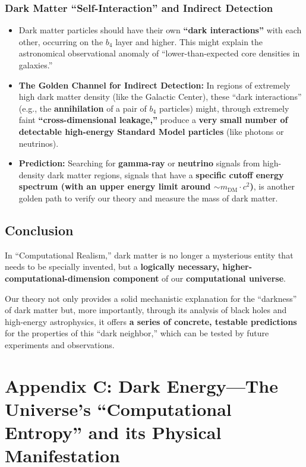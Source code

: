 \documentclass[11pt, a4paper]{article}
\begin{document}
\subsubsection{Dark Matter ``Self-Interaction'' and Indirect Detection}
\begin{itemize}
    \item Dark matter particles should have their own \textbf{``dark interactions''} with each other, occurring on the $b_4$ layer and higher. This might explain the astronomical observational anomaly of ``lower-than-expected core densities in galaxies.''
    \item \textbf{The Golden Channel for Indirect Detection:} In regions of extremely high dark matter density (like the Galactic Center), these ``dark interactions'' (e.g., the \textbf{annihilation} of a pair of $b_4$ particles) might, through extremely faint \textbf{``cross-dimensional leakage,''} produce a \textbf{very small number of detectable high-energy Standard Model particles} (like photons or neutrinos).
    \item \textbf{Prediction:} Searching for \textbf{gamma-ray} or \textbf{neutrino} signals from high-density dark matter regions, signals that have a \textbf{specific cutoff energy spectrum (with an upper energy limit around $\sim m_{\text{DM}} \cdot c^2$)}, is another golden path to verify our theory and measure the mass of dark matter.
\end{itemize}

\subsection*{Conclusion}
In ``Computational Realism,'' dark matter is no longer a mysterious entity that needs to be specially invented, but a \textbf{logically necessary, higher-computational-dimension component} of our \textbf{computational universe}.

Our theory not only provides a solid mechanistic explanation for the ``darkness'' of dark matter but, more importantly, through its analysis of black holes and high-energy astrophysics, it offers \textbf{a series of concrete, testable predictions} for the properties of this ``dark neighbor,'' which can be tested by future experiments and observations.









\section{Appendix C: Dark Energy—The Universe's ``Computational Entropy'' and its Physical Manifestation}
\end{document}
